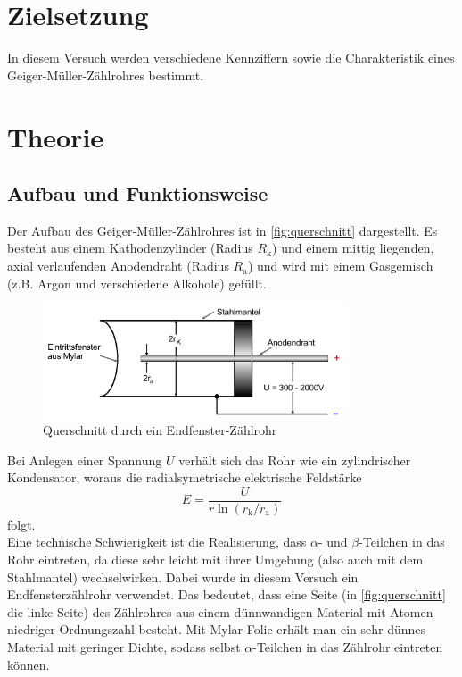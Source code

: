 \section*{Zielsetzung}
\label{sec:zielsetzung}

In diesem Versuch werden verschiedene Kennziffern sowie die Charakteristik eines Geiger-Müller-Zählrohres
bestimmt.

\section{Theorie}
\label{sec:Theorie}


\subsection{Aufbau und Funktionsweise}
\label{sec:aufbau}

Der Aufbau des Geiger-Müller-Zählrohres ist in \autoref{fig:querschnitt} dargestellt. Es besteht aus
einem Kathodenzylinder (Radius $R_\text{k}$) und einem mittig liegenden, axial verlaufenden
Anodendraht (Radius $R_\text{a}$) und wird mit einem Gasgemisch (z.B. Argon und verschiedene Alkohole) gefüllt.
\begin{figure}[H]
	\centering
	\includegraphics[width=0.8\textwidth]{content/querschnitt.png}
	\caption{Querschnitt durch ein Endfenster-Zählrohr \cite{sample}}
	\label{fig:querschnitt}
\end{figure}
\noindent
Bei Anlegen einer Spannung $U$ verhält sich das Rohr wie ein zylindrischer Kondensator, woraus die 
radialsymetrische elektrische Feldstärke
\begin{equation}
	E = \frac{U}{r \ln(r_\text{k} / r_\text{a})}
	\label{eqn:elektrisches-feld}
\end{equation}
folgt.
\\
Eine technische Schwierigkeit ist die Realisierung, dass $\alpha$- und
$\beta$-Teilchen in das Rohr eintreten, da diese sehr leicht mit ihrer Umgebung (also auch mit dem Stahlmantel)
wechselwirken. Dabei wurde in diesem
Versuch ein Endfensterzählrohr verwendet. Das bedeutet, dass eine Seite (in \autoref{fig:querschnitt} die linke
Seite) des Zählrohres aus einem dünnwandigen Material mit Atomen niedriger Ordnungszahl besteht. Mit Mylar-Folie 
erhält man ein sehr dünnes Material mit geringer Dichte, sodass selbst $\alpha$-Teilchen in das Zählrohr eintreten 
können.


